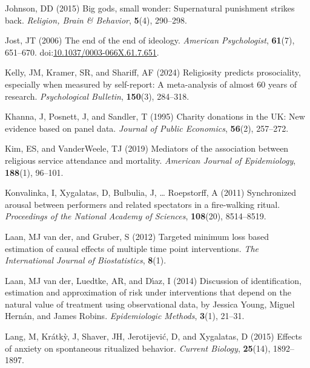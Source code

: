 \documentclass[
  single column]{article}
\newlength{\cslhangindent}
\newenvironment{CSLReferences}[2] %
 {\begin{list}{}{%
  \setlength{\itemindent}{0pt}
  \setlength{\leftmargin}{0pt}
  \setlength{\parsep}{0pt}
  \ifodd #1
   \setlength{\leftmargin}{\cslhangindent}
   \setlength{\itemindent}{-1\cslhangindent}
  \fi
  \setlength{\itemsep}{#2\baselineskip}}}
 {\end{list}}
\begin{document}
\begin{CSLReferences}{1}{0}
Johnson, DD (2015) Big gods, small wonder: Supernatural punishment
strikes back. \emph{Religion, Brain \& Behavior}, \textbf{5}(4),
290--298.

Jost, JT (2006) The end of the end of ideology. \emph{American
Psychologist}, \textbf{61}(7), 651--670.
doi:\href{https://doi.org/10.1037/0003-066X.61.7.651}{10.1037/0003-066X.61.7.651}.

Kelly, JM, Kramer, SR, and Shariff, AF (2024) Religiosity predicts
prosociality, especially when measured by self-report: A meta-analysis
of almost 60 years of research. \emph{Psychological Bulletin},
\textbf{150}(3), 284--318.

Khanna, J, Posnett, J, and Sandler, T (1995) Charity donations in the
UK: New evidence based on panel data. \emph{Journal of Public
Economics}, \textbf{56}(2), 257--272.

Kim, ES, and VanderWeele, TJ (2019) Mediators of the association between
religious service attendance and mortality. \emph{American Journal of
Epidemiology}, \textbf{188}(1), 96--101.

Konvalinka, I, Xygalatas, D, Bulbulia, J, \ldots{} Roepstorff, A (2011)
Synchronized arousal between performers and related spectators in a
fire-walking ritual. \emph{Proceedings of the National Academy of
Sciences}, \textbf{108}(20), 8514--8519.

Laan, MJ van der, and Gruber, S (2012) Targeted minimum loss based
estimation of causal effects of multiple time point interventions.
\emph{The International Journal of Biostatistics}, \textbf{8}(1).

Laan, MJ van der, Luedtke, AR, and Dı́az, I (2014) Discussion of
identification, estimation and approximation of risk under interventions
that depend on the natural value of treatment using observational data,
by {J}essica {Y}oung, {M}iguel {H}ern{á}n, and {J}ames {R}obins.
\emph{Epidemiologic Methods}, \textbf{3}(1), 21--31.

Lang, M, Krátkỳ, J, Shaver, JH, Jerotijević, D, and Xygalatas, D (2015)
Effects of anxiety on spontaneous ritualized behavior. \emph{Current
Biology}, \textbf{25}(14), 1892--1897.


\end{CSLReferences}
\end{document}
